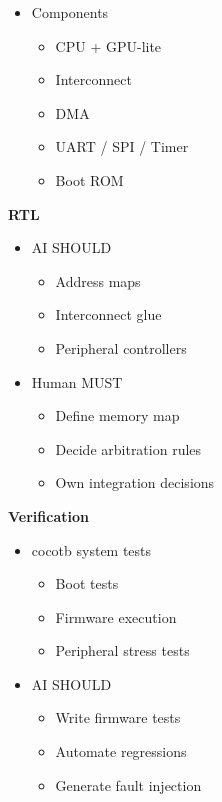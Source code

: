 \begin{record}

\begin{itemize}
\tightlist
\item
  Components

  \begin{itemize}
  \tightlist
  \item
    CPU + GPU-lite
  \item
    Interconnect
  \item
    DMA
  \item
    UART / SPI / Timer
  \item
    Boot ROM
  \end{itemize}
\end{itemize}

\textbf{RTL}

\begin{itemize}
\tightlist
\item
  AI SHOULD

  \begin{itemize}
  \tightlist
  \item
    Address maps
  \item
    Interconnect glue
  \item
    Peripheral controllers
  \end{itemize}
\item
  Human MUST

  \begin{itemize}
  \tightlist
  \item
    Define memory map
  \item
    Decide arbitration rules
  \item
    Own integration decisions
  \end{itemize}
\end{itemize}

\textbf{Verification}

\begin{itemize}
\tightlist
\item
  cocotb system tests

  \begin{itemize}
  \tightlist
  \item
    Boot tests
  \item
    Firmware execution
  \item
    Peripheral stress tests
  \end{itemize}
\item
  AI SHOULD

  \begin{itemize}
  \tightlist
  \item
    Write firmware tests
  \item
    Automate regressions
  \item
    Generate fault injection
  \end{itemize}
\end{itemize}


\end{record}
